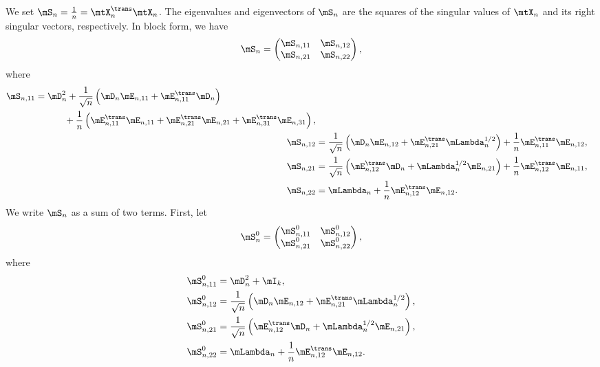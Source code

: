 We set $\mS_n = \frac{1}{n} = \mtX_n^\trans \mtX_n$.  The eigenvalues and eigenvectors of $\mS_n$ are the squares of the singular values of $\mtX_n$ and its right singular vectors, respectively.  In block form, we have
\[
    \mS_n
    =
    \left(
    \begin{matrix}
        \mS_{n,11} & \mS_{n,12} \\
        \mS_{n,21} & \mS_{n,22}
    \end{matrix}
    \right),
\]
where
\begin{align*}
    \begin{split}
    \mS_{n,11}
        &=
            \mD_n^2 
            + 
            \frac{1}{\sqrt{n}} 
            \left( 
                \mD_n \mE_{n,11} + \mE_{n,11}^\trans \mD_n
            \right) \\
            &\phantom{= \mD_n^2} +
            \frac{1}{n}
            \left(
                \mE_{n,11}^\trans \mE_{n,11}
                +
                \mE_{n,21}^\trans \mE_{n,21}
                +
                \mE_{n,31}^\trans \mE_{n,31}
            \right),
    \end{split} \\
    \mS_{n,12}
        &=
            \frac{1}{\sqrt{n}}
            \left(
                \mD_n \mE_{n,12} + \mE_{n,21}^\trans \mLambda_n^{1/2}
            \right)
            +
            \frac{1}{n}
            \mE_{n,11}^\trans \mE_{n,12}, \\
    \mS_{n,21}
        &=
            \frac{1}{\sqrt{n}}
            \left(
                \mE_{n,12}^\trans \mD_n
                +
                \mLambda_n^{1/2} \mE_{n,21}
            \right)
            +
            \frac{1}{n}
            \mE_{n,12}^\trans \mE_{n,11}, \\
    \mS_{n,22}
        &=
            \mLambda_n
            +
            \frac{1}{n}
            \mE_{n,12}^\trans \mE_{n,12}.
\end{align*}
We write $\mS_n$ as a sum of two terms.  First, let
\[
    \mS_n^0
    =
    \left(
    \begin{matrix}
        \mS_{n,11}^0 & \mS_{n,12}^0 \\
        \mS_{n,21}^0 & \mS_{n,22}^0
    \end{matrix}
    \right),
\]
where
\begin{align*}
    \mS_{n,11}^0
        &=
            \mD_n^2 + \mI_k, \\
    \mS_{n,12}^0
        &=
            \frac{1}{\sqrt{n}} 
            \left( 
                \mD_n \mE_{n,12}
                +
                \mE_{n,21}^\trans \mLambda_n^{1/2} 
            \right), \\
    \mS_{n,21}^0
        &=
            \frac{1}{\sqrt{n}} 
            \left( 
                \mE_{n,12}^\trans \mD_n
                +
                \mLambda_n^{1/2} \mE_{n,21}
                \right), \\
    \mS_{n,22}^0
        &=
            \mLambda_n 
            +
            \frac{1}{n}
            \mE_{n,12}^\trans \mE_{n,12}.
\end{align*}
